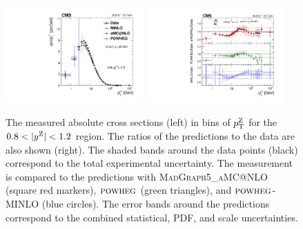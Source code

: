 \begin{figure}
	\centering
	\includegraphics[width=0.47\textwidth]{figures/zpt/zll_double_rap2.pdf}
        \includegraphics[width=0.47\textwidth]{figures/zpt/zll_double_ratio_rap2.pdf}
	\caption{The measured absolute cross sections (left) in bins of $p_{\mathrm{T}}^{\mathrm{Z}}$ for the $0.8 < |y^{\mathrm{Z}}| < 1.2$ region. The ratios of the predictions to the data are also shown (right). The shaded bands around the data points (black) correspond to the total experimental uncertainty. The measurement is compared to the predictions with \textsc{MadGraph5\_aMC@NLO} (square red markers),  ${\textsc{powheg}}$ (green triangles), and ${\textsc{powheg}}$-\textsc{MINLO} (blue circles). The error bands around the predictions correspond to the combined statistical, PDF, and scale uncertainties.}
	\label{fig:zll_double2}
\end{figure}

